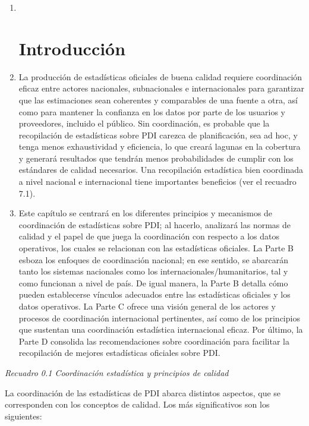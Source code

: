 \documentclass[
]{book}
\begin{document}
\begin{enumerate}
\def\labelenumi{\arabic{enumi}.}
\item ~
  \hypertarget{introducciuxf3n-8}{%
  \section{Introducción}\label{introducciuxf3n-8}}
\item
  La producción de estadísticas oficiales de buena calidad requiere coordinación eficaz entre actores nacionales, subnacionales e internacionales para garantizar que las estimaciones sean coherentes y comparables de una fuente a otra, así como para mantener la confianza en los datos por parte de los usuarios y proveedores, incluido el público. Sin coordinación, es probable que la recopilación de estadísticas sobre PDI carezca de planificación, sea ad hoc, y tenga menos exhaustividad y eficiencia, lo que creará lagunas en la cobertura y generará resultados que tendrán menos probabilidades de cumplir con los estándares de calidad necesarios. Una recopilación estadística bien coordinada a nivel nacional e internacional tiene importantes beneficios (ver el recuadro 7.1).
\item
  Este capítulo se centrará en los diferentes principios y mecanismos de coordinación de estadísticas sobre PDI; al hacerlo, analizará las normas de calidad y el papel de que juega la coordinación con respecto a los datos operativos, los cuales se relacionan con las estadísticas oficiales. La Parte B esboza los enfoques de coordinación nacional; en ese sentido, se abarcarán tanto los sistemas nacionales como los internacionales/humanitarios, tal y como funcionan a nivel de país. De igual manera, la Parte B detalla cómo pueden establecerse vínculos adecuados entre las estadísticas oficiales y los datos operativos. La Parte C ofrece una visión general de los actores y procesos de coordinación internacional pertinentes, así como de los principios que sustentan una coordinación estadística internacional eficaz. Por último, la Parte D consolida las recomendaciones sobre coordinación para facilitar la recopilación de mejores estadísticas oficiales sobre PDI.
\end{enumerate}

\emph{Recuadro 0.1 Coordinación estadística y principios de calidad}

La coordinación de las estadísticas de PDI abarca distintos aspectos, que se corresponden con los conceptos de calidad. Los más significativos son los siguientes:
\end{document}
